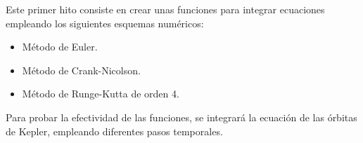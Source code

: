 
Este primer hito consiste en crear unas funciones para integrar ecuaciones empleando los siguientes esquemas numéricos:

\begin{itemize}
\item Método de Euler.
\item Método de Crank-Nicolson.
\item Método de Runge-Kutta de orden 4.
\end{itemize}

Para probar la efectividad de las funciones, se integrará la ecuación de las órbitas de Kepler, empleando diferentes pasos temporales. 